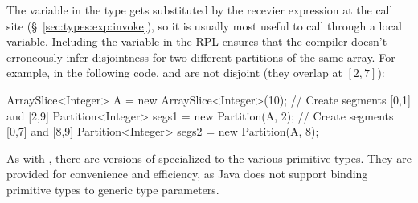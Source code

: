 The variable  in the type gets substituted by the recevier
expression at the call site (\S~\ref{sec:types:exp:invoke}), so it is
usually most useful to call  through a  local
variable.  Including the variable in the RPL ensures that the compiler
doesn't erroneously infer disjointness for two different partitions of
the same array.  For example, in the following code,
 and  are not disjoint (they
overlap at $[2,7]$):
%
\begin{dpjlisting}
ArraySlice<Integer> A = new ArraySlice<Integer>(10);
// Create segments [0,1] and [2,9]
Partition<Integer> segs1 = new Partition(A, 2);
// Create segments [0,7] and [8,9]
Partition<Integer> segs2 = new Partition(A, 8);
\end{dpjlisting}

 As with ,
there are versions of  specialized to the various
primitive types.  They are provided for convenience and efficiency, as
Java does not support binding primitive types to generic type
parameters.



